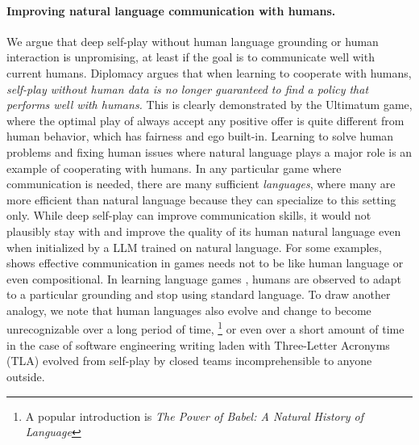 \paragraph{Improving natural language communication with humans.}
We argue that deep self-play without human language grounding or human interaction is unpromising, at least if the goal is to communicate well with current humans.
Diplomacy \cite{bakhtin2022human} argues that when learning to cooperate with humans, \emph{self-play without human data is no longer
guaranteed to find a policy that performs well
with humans.} This is clearly demonstrated by the Ultimatum game, where the optimal play of always accept any positive offer is quite different from human behavior, which has fairness and ego built-in. Learning to solve human problems and fixing human issues where natural language plays a major role is an example of cooperating with humans.
In any particular game where communication is needed, there are many sufficient \textit{languages}, where many are more efficient than natural language because they can specialize to this setting only. While deep self-play can improve communication skills, it would not plausibly stay with and improve the quality of its human natural language even when initialized by a LLM trained on natural language. 
For some examples, \cite{kottur2017natural} shows effective communication in games needs not to be like human language or even compositional. In learning language games \cite{wang2016learning}, humans are observed to adapt to a particular grounding and stop using standard language. To draw another analogy, we note that human languages also evolve and change to become unrecognizable over a long period of time,%
\footnote{A popular introduction is \textit{The Power of Babel: A Natural History of Language}}
or even over a short amount of time in the case of software engineering writing laden with Three-Letter Acronyms (TLA) evolved from self-play by closed teams incomprehensible to anyone outside.


